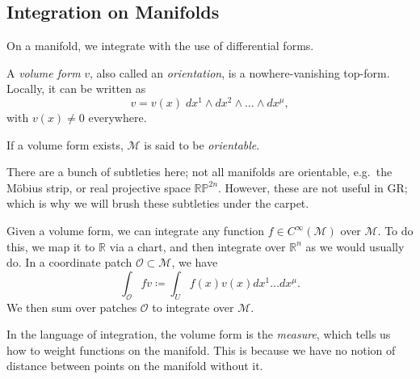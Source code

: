 \subsection{Integration on Manifolds}%
\label{sub:integration}

On a manifold, we integrate with the use of differential forms.
\begin{definition}
  A \emph{volume form} $v$, also called an \emph{orientation}, is a nowhere-vanishing top-form.
  Locally, it can be written as
  \begin{equation}
    v = v(x)\; dx^1 \wedge dx^2 \wedge \dots \wedge dx^\mu ,
  \end{equation}
  with $v(x) \neq 0$ everywhere.
\end{definition}
\begin{definition}[]
  If a volume form exists, $\mathcal{M}$ is said to be \emph{orientable}.
\end{definition}
\begin{leftbar}
  \begin{remark}
    There are a bunch of subtleties here; not all manifolds are orientable, e.g.~the Möbius strip, or real projective space $\mathbb{RP}^{2n}$.
    However, these are not useful in GR; which is why we will brush these subtleties under the carpet.
  \end{remark}
\end{leftbar}
\begin{definition}[integration]
  Given a volume form, we can integrate any function $f \in C^\infty(\mathcal{M})$ over $\mathcal{M}$.
  To do this, we map it to $\mathbb{R}$ via a chart, and then integrate over $\mathbb{R}^n$ as we would usually do.
  In a coordinate patch $\mathcal{O} \subset \mathcal{M}$, we have
  \begin{equation}
    \int_{\mathcal{O}} fv \coloneqq \int_{U} f(x) v(x) dx^1 \dots dx^\mu .
  \end{equation}
  We then sum over patches $\mathcal{O}$ to integrate over $\mathcal{M}$.
\end{definition}
\begin{leftbar}
  \begin{remark}
    In the language of integration, the volume form is the \emph{measure}, which tells us how to weight functions on the manifold. This is because we have no notion of distance between points on the manifold without it.
  \end{remark}
\end{leftbar}

